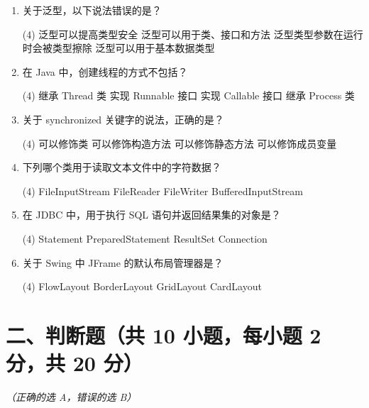 \documentclass[a3paper, landscape, 11pt, twocolumn]{article}
\begin{document}
\begin{enumerate}[label=\arabic*., itemsep=0.8em]
	\item 关于泛型，以下说法错误的是？
	      \begin{tasks}(4)
		      \task 泛型可以提高类型安全
		      \task 泛型可以用于类、接口和方法
		      \task 泛型类型参数在运行时会被类型擦除
		      \task 泛型可以用于基本数据类型
	      \end{tasks}

	\item 在 Java 中，创建线程的方式不包括？
	      \begin{tasks}(4)
		      \task 继承 Thread 类
		      \task 实现 Runnable 接口
		      \task 实现 Callable 接口
		      \task 继承 Process 类
	      \end{tasks}

	\item 关于 synchronized 关键字的说法，正确的是？
	      \begin{tasks}(4)
		      \task 可以修饰类
		      \task 可以修饰构造方法
		      \task 可以修饰静态方法
		      \task 可以修饰成员变量
	      \end{tasks}

	\item 下列哪个类用于读取文本文件中的字符数据？
	      \begin{tasks}(4)
		      \task FileInputStream
		      \task FileReader
		      \task FileWriter
		      \task BufferedInputStream
	      \end{tasks}

	\item 在 JDBC 中，用于执行 SQL 语句并返回结果集的对象是？
	      \begin{tasks}(4)
		      \task Statement
		      \task PreparedStatement
		      \task ResultSet
		      \task Connection
	      \end{tasks}

	\item 关于 Swing 中 JFrame 的默认布局管理器是？
	      \begin{tasks}(4)
		      \task FlowLayout
		      \task BorderLayout
		      \task GridLayout
		      \task CardLayout
	      \end{tasks}
\end{enumerate}

\vspace{0.5cm}

\section*{二、判断题（共 10 小题，每小题 2 分，共 20 分）}
\textit{（正确的选 A，错误的选 B）}
\end{document}
